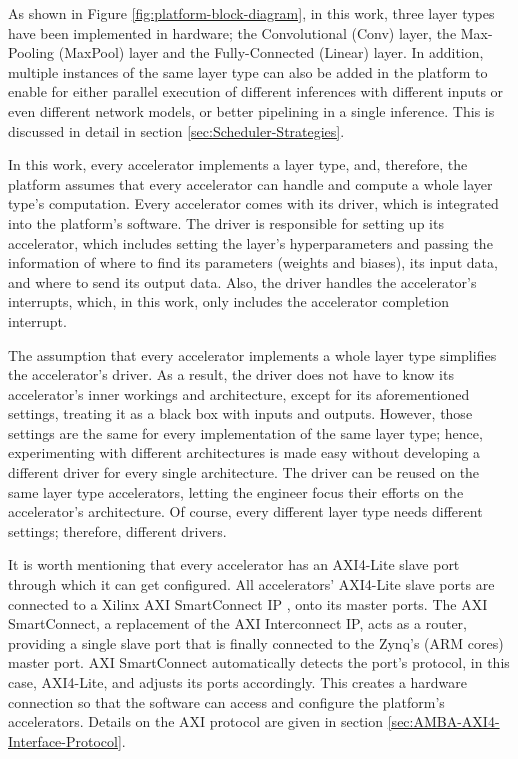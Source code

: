 As shown in Figure \ref{fig:platform-block-diagram}, in this work, three layer types have been implemented in hardware; the Convolutional (Conv) layer, the Max-Pooling (MaxPool) layer and the Fully-Connected (Linear) layer. In addition, multiple instances of the same layer type can also be added in the platform to enable for either parallel execution of different inferences with different inputs or even different network models, or better pipelining in a single inference. This is discussed in detail in section \ref{sec:Scheduler-Strategies}.

In this work, every accelerator implements a layer type, and, therefore, the platform assumes that every accelerator can handle and compute a whole layer type's computation. Every accelerator comes with its driver, which is integrated into the platform's software. The driver is responsible for setting up its accelerator, which includes setting the layer's hyperparameters and passing the information of where to find its parameters (weights and biases), its input data, and where to send its output data. Also, the driver handles the accelerator's interrupts, which,  in this work, only includes the accelerator completion interrupt.

The assumption that every accelerator implements a whole layer type simplifies the accelerator's driver. As a result, the driver does not have to know its accelerator's inner workings and architecture, except for its aforementioned settings, treating it as a black box with inputs and outputs. However, those settings are the same for every implementation of the same layer type; hence, experimenting with different architectures is made easy without developing a different driver for every single architecture. The driver can be reused on the same layer type accelerators, letting the engineer focus their efforts on the accelerator's architecture. Of course, every different layer type needs different settings; therefore, different drivers.

It is worth mentioning that every accelerator has an AXI4-Lite \cite{UG1037-Vivado-Design-Suite-AXI-Reference-Guide} slave port through which it can get configured. All accelerators' AXI4-Lite slave ports are connected to a Xilinx AXI SmartConnect IP \cite{PG247-SmartConnect-Product-Guide}, onto its master ports. The AXI SmartConnect, a replacement of the AXI Interconnect IP, acts as a router, providing a single slave port that is finally connected to the Zynq's (ARM cores) master port. AXI SmartConnect automatically detects the port's protocol, in this case, AXI4-Lite, and adjusts its ports accordingly. This creates a hardware connection so that the software can access and configure the platform's accelerators. Details on the AXI protocol are given in section \ref{sec:AMBA-AXI4-Interface-Protocol}.

